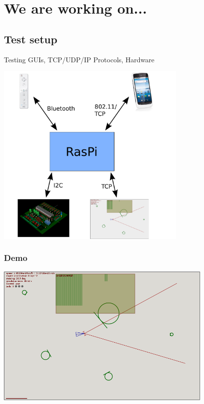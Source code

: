 \documentclass[pdf]{beamer}
\begin{document}
\section{We are working on...}
\subsection{Test setup}
\begin{frame}
Testing GUIs, TCP/UDP/IP Protocols, Hardware
  \begin{center}
  \includegraphics[width = 0.7\textwidth]{pics/raw/software2.pdf}
  \end{center}
\end{frame}
\begin{frame}
\frametitle{Demo}
  \begin{center}
  \includegraphics[width = 0.8\textwidth]{pics/raw/sim.png}
  \end{center}
\end{frame}
\end{document}
